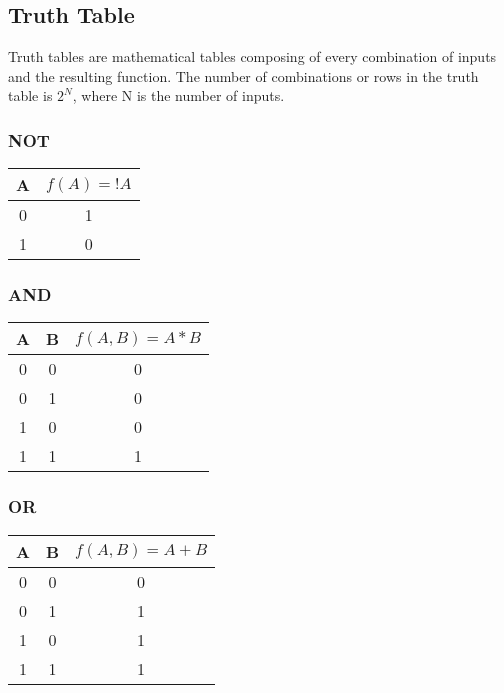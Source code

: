 \documentclass[11pt]{article}
\begin{document}
\subsection{Truth Table}

Truth tables are mathematical tables composing of every combination of inputs and the resulting function. The number of combinations or rows in the truth table is \( 2^N \), where N is the number of inputs.

\subsubsection{NOT}

\begin{table}[H]
	\centering
	\begin{tabular}{c | c}
		A	&	\( f(A) = !A \)\\
		\hline
		0	&	1\\
		1	&	0
	\end{tabular}
\end{table}

\subsubsection{AND}

\begin{table}[H]
	\centering
	\begin{tabular}{c c | c}
		A	&	B	&	\( f(A,B) = A * B \)\\
		\hline
		0	&	0	&	0\\
		0	&	1	&	0\\
		1	&	0	&	0\\
		1	&	1	&	1
	\end{tabular}
\end{table}

\subsubsection{OR}

\begin{table}[H]
	\centering
	\begin{tabular}{c c | c}
		A	&	B	&	\( f(A,B) = A + B \)\\
		\hline
		0	&	0	&	0\\
		0	&	1	&	1\\
		1	&	0	&	1\\
		1	&	1	&	1
	\end{tabular}
\end{table}
\end{document}
